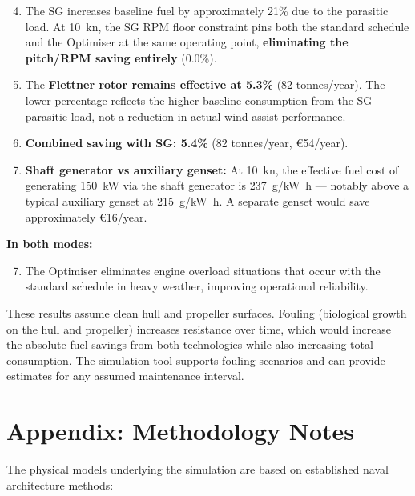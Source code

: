 \documentclass[a4paper,11pt]{article}
\begin{document}
\begin{enumerate}
\setcounter{enumi}{3}
\item The SG increases baseline fuel by approximately 21\% due to the
parasitic load.  At \SI{10}{\knot}, the SG RPM floor constraint pins both
the standard schedule and the Optimiser at the same operating point,
\textbf{eliminating the pitch/RPM saving entirely} (0.0\%).

\item The \textbf{Flettner rotor remains effective at 5.3\%} (82 tonnes/year).
The lower percentage reflects the higher baseline consumption from the SG
parasitic load, not a reduction in actual wind-assist performance.

\item \textbf{Combined saving with SG: 5.4\%} (82 tonnes/year,
\euro54/year).

\item \textbf{Shaft generator vs auxiliary genset:} At \SI{10}{\knot}, the effective fuel
cost of generating \SI{150}{\kilo\watt} via the shaft generator is
\SI{237}{\gram/\kilo\watt\hour} --- notably above a typical
auxiliary genset at \SI{215}{\gram/\kilo\watt\hour}.  A separate genset would
save approximately \euro16/year.
\end{enumerate}

\textbf{In both modes:}

\begin{enumerate}
\setcounter{enumi}{6}
\item The Optimiser eliminates engine overload situations that occur with the
standard schedule in heavy weather, improving operational reliability.
\end{enumerate}

These results assume clean hull and propeller surfaces.  Fouling (biological
growth on the hull and propeller) increases resistance over time, which would
increase the absolute fuel savings from both technologies while also increasing
total consumption.  The simulation tool supports fouling scenarios and can
provide estimates for any assumed maintenance interval.

\section{Appendix: Methodology Notes}
\label{sec:orgdf17425}

The physical models underlying the simulation are based on established
naval architecture methods:
\end{document}
